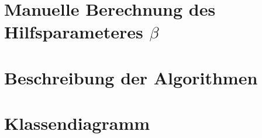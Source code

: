 \clearpage
\section{Manuelle Berechnung des Hilfsparameteres $\beta$}
\label{app:beta}


\clearpage
\section{Beschreibung der Algorithmen}
\label{app:algos}


\clearpage
\section{Klassendiagramm}
\clearpage
\label{app:classdiagram}
%
